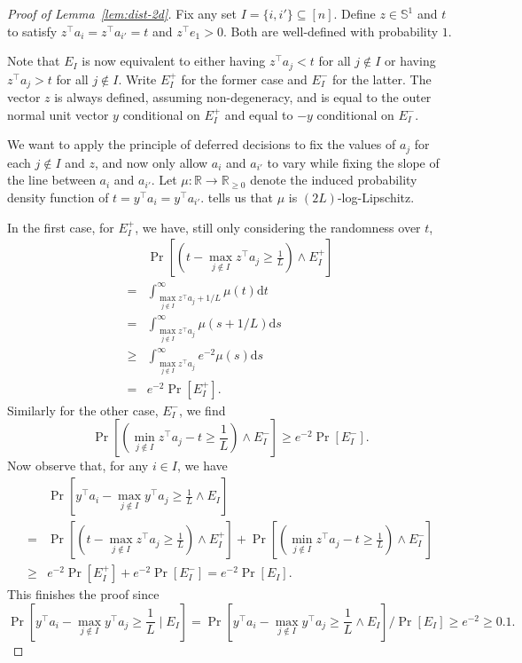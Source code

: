 \documentclass{theoretics}
\newcommand{\R}{\mathbb R}
\newcommand{\T}{\top}
\renewcommand{\subset}{\subseteq}
\begin{document}
\begin{proof}[Proof of Lemma~\ref{lem:dist-2d}]
    Fix any set $I = \{i, i'\} \subset [n]$.
    Define $z \in \mathbb S^1$ and $t$ to satisfy $z^\T a_i = z^\T a_{i'} = t$
    and $z^\T e_1 > 0$. Both are well-defined with probability $1$.

    Note that $E_I$ is now equivalent to either having $z^\T a_j < t$ for all $j \notin I$
    or having $z^\T a_j > t$ for all $j \notin I$. Write $E_I^+$ for the former case and $E_I^-$ for the latter.
    The vector $z$ is always defined, assuming non-degeneracy, and is equal to
    the outer normal unit vector $y$ conditional on $E_I^+$ and equal to $-y$ conditional on $E_I^-$.

    We want to apply the principle of deferred decisions to fix the values of $a_j$ for each $j \notin I$
    and $z$, and now only allow $a_{i}$ and $a_{i'}$ to vary while fixing the slope of the line between $a_{i}$ and $a_{i'}$.
    Let $\mu: \R \to \R_{\geq 0}$ denote the induced probability density function of $t = y^\top a_i =  y^\top a_{i'}$.
     tells us that $\mu$ is $(2L)$-log-Lipschitz. 

    In the first case, for $E_I^+$, we have, still only considering the randomness over $t$,
    \begin{align*}
         & \Pr[ (t - \max_{j \notin I} z^\top a_j \geq \frac{1}{L}) \wedge E_I^+] \\
        = & \int_{\max_{j \notin I} z^\top a_j + 1/L}^\infty \mu(t) \mathrm dt \\
        = & \int_{\max_{j \notin I} z^\top a_j}^\infty \mu(s+1/L) \mathrm ds \\
         \geq & \int_{\max_{j \notin I} z^\top a_j}^\infty e^{-2} \mu(s) \mathrm ds \tag{By $(2L)$-log-Lipschitzness of $\mu$} \\
        = & e^{-2} \Pr[E_I^+].
    \end{align*}
    Similarly for the other case, $E_I^-$, we find
    \[
    \Pr[ (\min_{j \notin I} z^\top a_j - t \geq \frac{1}{L}) \wedge E_I^-]
    \geq e^{-2}\Pr[E_I^-].
    \]
    Now observe that, for any $i \in I$, we have
    \begin{align*}
        &\Pr[y^\top a_i - \max_{j \notin I} y^\top a_j \geq \frac{1}{L} \wedge E_I] \\
        =& \Pr[ (t - \max_{j \notin I} z^\top a_j \geq \frac{1}{L}) \wedge E_I^+]
        + \Pr[ (\min_{j \notin I} z^\top a_j  - t\geq \frac{1}{L}) \wedge E_I^-]\\
        \geq & e^{-2} \Pr[E_I^+] + e^{-2}\Pr[E_I^-] = e^{-2}\Pr[E_I].
    \end{align*}
    This finishes the proof since
    \[
    \Pr[y^\top a_i - \max_{j \notin I} y^\top a_j \geq \frac{1}{L} \mid E_I]
    =\Pr[y^\top a_i - \max_{j \notin I} y^\top a_j \geq \frac{1}{L} \wedge E_I]/\Pr[E_I]
    \geq e^{-2} \geq 0.1.
    \]
\end{proof}
\end{document}
